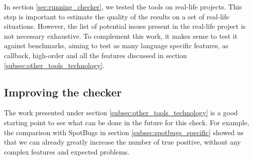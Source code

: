 In section \ref{sec:running_checker}, we tested the tools on real-life projects.
This step is important to estimate the quality of the results on a set of real-life situations.
However, the list of potential issues present in the real-life project is not necessary exhaustive. 
To complement this work, it makes sense to test it against benchmarks, aiming to test as many language specific features, as callback, high-order and all the features discussed in section \ref{subsec:other_tools_technology}.

\subsection{Improving the checker}
\label{subsec:other_tools}

The work presented under section \ref{subsec:other_tools_technology} is a good starting point to see what can be done in the future for this check. 
For example, the comparison with SpotBugs in section \ref{subsec:spotbugs_specific} showed us that we can already greatly increase the number of true positive, without any complex features and expected problems.